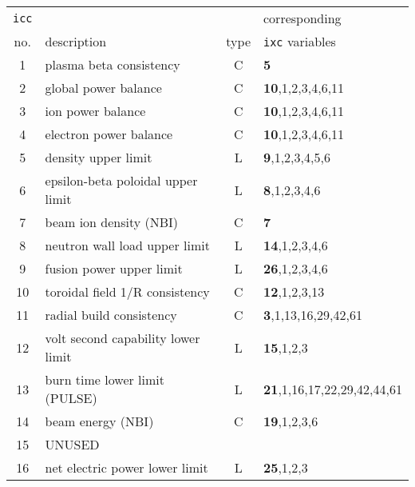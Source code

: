 \documentclass[11pt,a4paper]{report}
\begin{document}
\begin{table}[tbph]
\footnotesize
\begin{center}

\begin{tabular}{||c|l|c|l||} \hline
\texttt{icc} &                                                  &      & corresponding \\
no. & description                                               & type & \texttt{ixc} variables \\ \hline
1   & plasma beta consistency                                   & C    & \textbf{5} \\
2   & global power balance                                      & C    & \textbf{10},1,2,3,4,6,11 \\
3   & ion power balance                                         & C    & \textbf{10},1,2,3,4,6,11 \\
4   & electron power balance                                    & C    & \textbf{10},1,2,3,4,6,11 \\
5   & density upper limit                                       & L    & \textbf{9},1,2,3,4,5,6 \\
6   & epsilon-beta poloidal upper limit                         & L    & \textbf{8},1,2,3,4,6 \\
7   & beam ion density (NBI)                                    & C    & \textbf{7} \\
8   & neutron wall load upper limit                             & L    & \textbf{14},1,2,3,4,6 \\
9   & fusion power upper limit                                  & L    & \textbf{26},1,2,3,4,6 \\
10  & toroidal field 1/R consistency                            & C    & \textbf{12},1,2,3,13 \\
11  & radial build consistency                                  & C    & \textbf{3},1,13,16,29,42,61 \\
12  & volt second capability lower limit                        & L    & \textbf{15},1,2,3 \\
13  & burn time lower limit (PULSE)                             & L    & \textbf{21},1,16,17,22,29,42,44,61 \\
14  & beam energy (NBI)                                         & C    & \textbf{19},1,2,3,6 \\
15  & UNUSED                                                    &      & \\
16  & net electric power lower limit                            & L    & \textbf{25},1,2,3 \\

\end{tabular}
\end{center}
\end{table}
\end{document}
